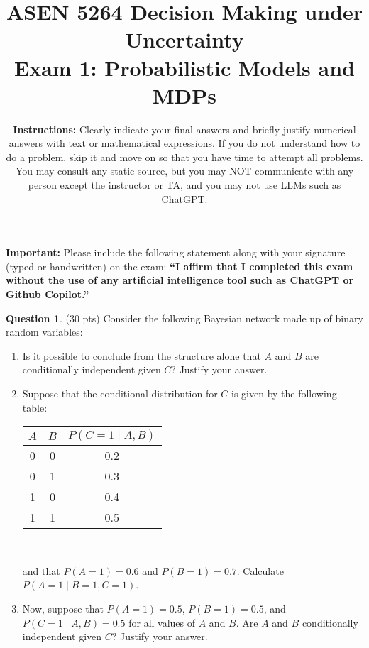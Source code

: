 \documentclass{article}
\title{ASEN 5264 Decision Making under Uncertainty\\
       Exam 1: Probabilistic Models and MDPs}
\date{\small 
    \textbf{Instructions:} Clearly indicate your final answers and briefly justify numerical answers with text or mathematical expressions. If you do not understand how to do a problem, skip it and move on so that you have time to attempt all problems. You may consult any static source, but you may NOT communicate with any person except the instructor or TA, and you may not use LLMs such as ChatGPT.
}
\theoremstyle{definition}
\newtheorem{question}[thm]{Question}
\begin{document}
\maketitle

\noindent\textbf{Important:} Please include the following statement along with your signature (typed or handwritten) on the exam: \textbf{``I affirm that I completed this exam without the use of any artificial intelligence tool such as ChatGPT or Github Copilot.''}

\begin{question} (30 pts)
    Consider the following Bayesian network made up of binary random variables:
    \begin{center}
    \end{center}

    \begin{enumerate}[label=\alph*)]
        \item Is it possible to conclude from the structure alone that $A$ and $B$ are conditionally independent given $C$? Justify your answer.
        \item Suppose that the conditional distribution for $C$ is given by the following table:
        \begin{center}
        \begin{tabular}{cc|c}
            \toprule
            $A$ & $B$ & $P(C=1 \mid A,B)$ \\
            \midrule
            0 & 0 & 0.2 \\
            0 & 1 & 0.3 \\
            1 & 0 & 0.4 \\
            1 & 1 & 0.5 \\
            \bottomrule
        \end{tabular}\\
        \end{center}
        and that $P(A=1) = 0.6$ and $P(B=1) = 0.7$. Calculate $P(A=1 \mid B=1, C=1)$.
        \item Now, suppose that $P(A=1) = 0.5$, $P(B=1) = 0.5$, and $P(C=1 \mid A, B) = 0.5$ for all values of $A$ and $B$. Are $A$ and $B$ conditionally independent given $C$? Justify your answer.
    \end{enumerate}
\end{question}
\end{document}
